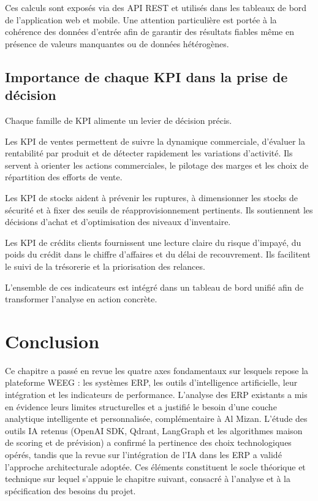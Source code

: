 \documentclass[a4paper,12pt]{report}
\begin{document}
Ces calculs sont exposés via des API REST et utilisés dans les tableaux de bord
de l'application web et mobile. Une attention particulière est portée à la
cohérence des données d'entrée afin de garantir des résultats fiables même en
présence de valeurs manquantes ou de données hétérogènes.

\subsection{Importance de chaque KPI dans la prise de décision}

Chaque famille de KPI alimente un levier de décision précis.

Les KPI de ventes permettent de suivre la dynamique commerciale, d'évaluer la
rentabilité par produit et de détecter rapidement les variations d'activité.
Ils servent à orienter les actions commerciales, le pilotage des marges et les
choix de répartition des efforts de vente.

Les KPI de stocks aident à prévenir les ruptures, à dimensionner les stocks de
sécurité et à fixer des seuils de réapprovisionnement pertinents. Ils soutiennent
les décisions d'achat et d'optimisation des niveaux d'inventaire.

Les KPI de crédits clients fournissent une lecture claire du risque d'impayé,
du poids du crédit dans le chiffre d'affaires et du délai de recouvrement. Ils
facilitent le suivi de la trésorerie et la priorisation des relances.

L'ensemble de ces indicateurs est intégré dans un tableau de bord unifié afin de
transformer l'analyse en action concrète.

\section{Conclusion}

Ce chapitre a passé en revue les quatre axes fondamentaux sur lesquels repose la plateforme WEEG : les systèmes ERP, les outils d'intelligence artificielle, leur intégration et les indicateurs de performance. L'analyse des ERP existants a mis en évidence leurs limites structurelles et a justifié le besoin d'une couche analytique intelligente et personnalisée, complémentaire à Al Mizan. L'étude des outils IA retenus (OpenAI SDK, Qdrant, LangGraph et les algorithmes maison de scoring et de prévision) a confirmé la pertinence des choix technologiques opérés, tandis que la revue sur l'intégration de l'IA dans les ERP a validé l'approche architecturale adoptée. Ces éléments constituent le socle théorique et technique sur lequel s'appuie le chapitre suivant, consacré à l'analyse et à la spécification des besoins du projet.
\end{document}
